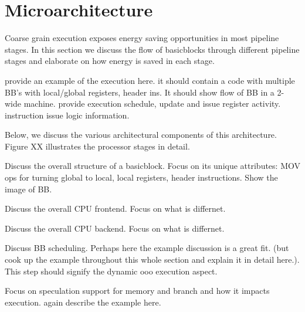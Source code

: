 \section{Microarchitecture}
\label{sec:arch}

Coarse grain execution exposes energy saving opportunities in most pipeline
stages. In this section we discuss the flow of basicblocks through different
pipeline stages and elaborate on how energy is saved in each stage.

provide an example of the execution here.  it should contain a code with
multiple BB's with local/global registers, header ins.  It should show flow of
BB in a 2-wide machine. provide execution schedule, update and issue register
activity. instruction issue logic information.

Below, we discuss the various architectural components of this architecture.
Figure XX illustrates the processor stages in detail.

Discuss the overall structure of a basicblock. Focus on its unique attributes:
MOV ops for turning global to local, local registers, header instructions. Show
the image of BB.


Discuss the overall CPU frontend. Focus on what is differnet.


Discuss the overall CPU backend. Focus on what is differnet.


Discuss BB scheduling. Perhaps here the example discussion is a great fit. (but
        cook up the example throughout this whole section and explain it in
        detail here.). This step should signify the dynamic ooo execution
aspect.


Focus on speculation support for memory and branch and how it impacts execution.
again describe the example here.

